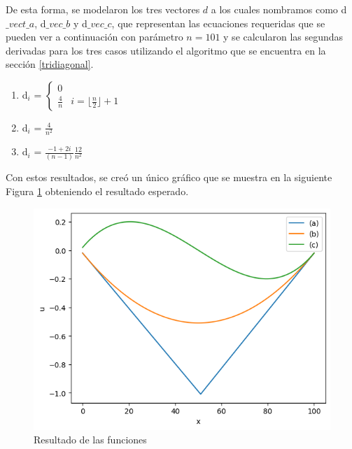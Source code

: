     De esta forma, se modelaron los tres vectores $d$ a los cuales nombramos como d$\_vect\_a$, d$\_vec\_b$  y d$\_vec\_c$, que representan las ecuaciones requeridas que se pueden ver a continuación con parámetro $n=101$  y se calcularon las segundas derivadas para los tres casos utilizando el algoritmo que se encuentra en la sección \ref{tridiagonal}.
    
    \begin{enumerate}[label=\alph*)] %
    \label{ec_ej4}
    \item d$_{i}$ = 
       $\begin{cases}
         0\\
          \frac{4}{n} & i=\lfloor \frac{n}{2} \rfloor   +1
      \end{cases}$

    \item d$_{i}$ = $\frac{4}{n^{2}}$

    \item d$_{i}$ = $\frac{-1+2i}{(n-1)}\frac{12}{n^{2}}$

    \end{enumerate}


    Con estos resultados, se creó un único gráfico que se muestra en la siguiente Figura \ref{result_laplaciano} obteniendo el resultado esperado.

    \begin{figure}[H]
    \centerline{\includegraphics[scale=0.45]{./img/resultado_tridiag}}
    \caption{Resultado de las funciones}
    \label{result_laplaciano}
    \end{figure}

